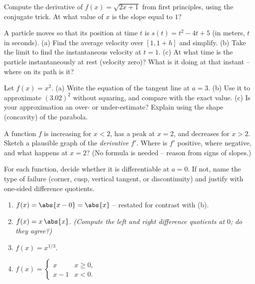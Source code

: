 \begin{exercise}
\label{ch10:ex-root}
Compute the derivative of $f(x) = \sqrt{2x + 1}$ from first principles, using the
conjugate trick. At what value of $x$ is the slope equal to $1$?
\end{exercise}

\begin{exercise}
\label{ch10:ex-speed}
A particle moves so that its position at time $t$ is $s(t) = t^2 - 4t + 5$ (in
meters, $t$ in seconds). (a) Find the average velocity over $[1, 1+h]$ and
simplify. (b) Take the limit to find the instantaneous velocity at $t = 1$.
(c) At what time is the particle instantaneously at rest (velocity zero)? What is
it doing at that instant -- where on its path is it?
\end{exercise}

\begin{exercise}
\label{ch10:ex-tangent}
Let $f(x) = x^2$. (a) Write the equation of the tangent line at $a = 3$. (b) Use
it to approximate $(3.02)^2$ without squaring, and compare with the exact value.
(c) Is your approximation an over- or under-estimate? Explain using the shape
(concavity) of the parabola.
\end{exercise}

\begin{exercise}
\label{ch10:ex-reading}
A function $f$ is increasing for $x < 2$, has a peak at $x = 2$, and decreases for
$x > 2$. Sketch a plausible graph of the \emph{derivative} $f'$. Where is $f'$
positive, where negative, and what happens at $x = 2$? (No formula is needed --
reason from signs of slopes.)
\end{exercise}

\begin{exercise}
\label{ch10:ex-fails}
For each function, decide whether it is differentiable at $a = 0$. If not, name
the type of failure (corner, cusp, vertical tangent, or discontinuity) and justify
with one-sided difference quotients.
\begin{enumerate}[label=(\alph*)]
  \item $f(x) = \abs{x - 0} = \abs{x}$ -- restated for contrast with (b).
  \item $f(x) = x\,\abs{x}$. \emph{(Compute the left and right difference
  quotients at $0$; do they agree?)}
  \item $f(x) = x^{1/3}$.
  \item $f(x) = \begin{cases} x & x \ge 0,\\ x - 1 & x < 0.\end{cases}$
\end{enumerate}
\end{exercise}


